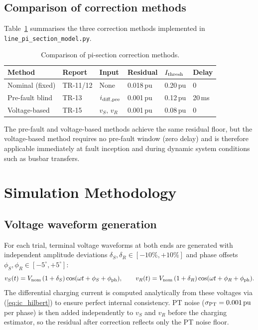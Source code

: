 \documentclass[11pt,a4paper]{article}
\newcommand{\pu}{\,\text{pu}}
\begin{document}
\subsection{Comparison of correction methods}

Table~\ref{tab:methods} summarises the three correction methods implemented
in \texttt{line\_pi\_section\_model.py}.

\begin{table}[h]
  \centering
  \caption{Comparison of pi-section correction methods.}
  \label{tab:methods}
  \begin{tabular}{llllll}
    \toprule
    Method & Report & Input & Residual & $I_{\rm thresh}$ & Delay \\
    \midrule
    Nominal (fixed) & TR-11/12 & None  & 0.018\,pu & 0.20\,pu & 0 \\
    Pre-fault blind & TR-13    & $i_{\rm diff,pre}$ & 0.001\,pu & 0.12\,pu & 20\,ms \\
    Voltage-based   & TR-15    & $v_S,\,v_R$        & 0.001\,pu & 0.08\,pu & 0 \\
    \bottomrule
  \end{tabular}
\end{table}

The pre-fault and voltage-based methods achieve the same residual floor, but
the voltage-based method requires no pre-fault window (zero delay) and is
therefore applicable immediately at fault inception and during dynamic system
conditions such as busbar transfers.

\section{Simulation Methodology}
\label{sec:simulation}

\subsection{Voltage waveform generation}

For each trial, terminal voltage waveforms at both ends are generated with
independent amplitude deviations
$\delta_S, \delta_R \in [-10\%, +10\%]$ and phase offsets
$\phi_S, \phi_R \in [-5^\circ, +5^\circ]$:
\begin{equation}
  v_S(t) = V_{\rm nom}\,(1+\delta_S)\cos(\omega t + \phi_S + \phi_{\rm ph}),
  \qquad
  v_R(t) = V_{\rm nom}\,(1+\delta_R)\cos(\omega t + \phi_R + \phi_{\rm ph}).
  \label{eq:voltage_model}
\end{equation}
The differential charging current is computed analytically from these voltages
via (\ref{eq:ic_hilbert}) to ensure perfect internal consistency.  PT noise
($\sigma_{\rm PT} = 0.001\pu$ per phase) is then added independently to $v_S$
and $v_R$ before the charging estimator, so the residual after correction
reflects only the PT noise floor.
\end{document}
